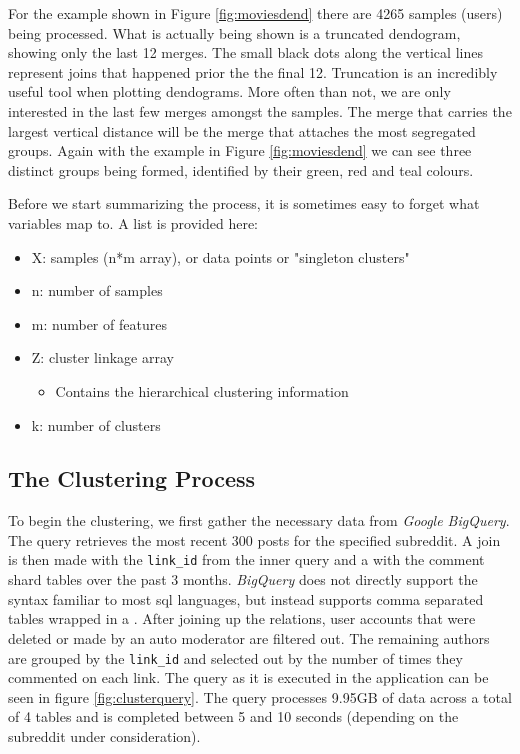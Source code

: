 \documentclass[msc,oneside]{ubcthesis}%
\begin{document}
\par
For the example shown in Figure \ref{fig:moviesdend} there are 4265 samples (users) being processed. What is actually being shown is a truncated dendogram, showing only the last 12 merges. The small black dots along the vertical lines represent joins that happened prior the the final 12. Truncation is an incredibly useful tool when plotting dendograms. More often than not, we are only interested in the last few merges amongst the samples. The merge that carries the largest vertical distance will be the merge that attaches the most segregated groups. Again with the example in Figure \ref{fig:moviesdend} we can see three distinct groups being formed, identified by their green, red and teal colours.
\par
Before we start summarizing the process, it is sometimes easy to forget what variables map to. A list is provided here:
\begin{itemize}
\item{X: samples (n*m array), or data points or "singleton clusters"}
\item{n: number of samples}
\item{m: number of features}
\item{Z: cluster linkage array}
	\begin{itemize}
	\item{Contains the hierarchical clustering information}
	\end{itemize}
\item{k: number of clusters}
\end{itemize}
\par

\subsection{The Clustering Process}
To begin the clustering, we first gather the necessary data from \textit{Google BigQuery}. The query retrieves the most recent 300 posts for the specified subreddit. A join is then made with the \texttt{link\_id} from the inner query and a  with the comment shard tables over the past 3 months. \textit{BigQuery} does not directly support the  syntax familiar to most sql languages, but instead supports comma separated tables wrapped in a . After joining up the relations, user accounts that were deleted or made by an auto moderator are filtered out. The remaining authors are grouped by the \texttt{link\_id} and selected out by the number of times they commented on each link. The query as it is executed in the application can be seen in figure \ref{fig:clusterquery}. The query processes 9.95GB of data across a total of 4 tables and is completed between 5 and 10 seconds (depending on the subreddit under consideration).
\end{document}
